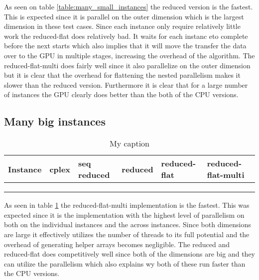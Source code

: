 
As seen on table \ref{table:many_small_instances} the reduced version is the fastest. This is expected since it is parallel on the outer dimension which is the largest dimension in these test cases. Since each instance only require relatively little work the reduced-flat does relatively bad. It waits for each instanc eto complete before the next starts which also implies that it will move the transfer the data over to the GPU in multiple stages, increasing the overhead of the algorithm. The reduced-flat-multi does fairly well since it also parallelize on the outer dimension but it is clear that the overhead for flattening the nested parallelism makes it slower than the reduced version. Furthermore it is clear that for a large number of instances the GPU clearly does better than the both of the CPU versions.


\subsection{Many big instances}
\begin{table}[H]
	\centering
	\caption{My caption}
	\label{table:many_big_instances}
	\begin{tabular}{|l|l|l|l|l|l|}\hline
		Instance & cplex & seq reduced & reduced & reduced-flat & reduced-flat-multi \\\hline
		&       &             &         &              &                    \\\hline
		&       &             &         &              &                    \\\hline
		&       &             &         &              &                   \\\hline
	\end{tabular}
\end{table}


As seen in table \ref{table:many_big_instances} the reduced-flat-multi implementation is the fastest. This was expected since it is the implementation with the highest level of parallelism on both on the individual instances and the across instances. Since both dimensions are large it effectively utilizes the number of threads to its full potential and the overhead of generating helper arrays becomes negligible. The reduced and reduced-flat does competitively well since both of the dimensions are big and they can utilize the parallelism which also explains wy both of these run faster than the CPU versions.

